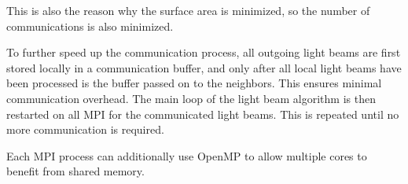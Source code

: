 This is also the reason why the surface area is minimized, so the number of communications is also minimized.
\par
% 
To further speed up the communication process, all outgoing light beams are first stored locally in a communication buffer, and only after all local light beams have been processed is the buffer passed on to the neighbors.
This ensures minimal communication overhead.
The main loop of the light beam algorithm is then restarted on all \ac{MPI}  for the communicated light beams.
This is repeated until no more communication is required.
\par
%
Each \ac{MPI} process can additionally use \ac{OpenMP} to allow multiple cores to benefit from shared memory.
